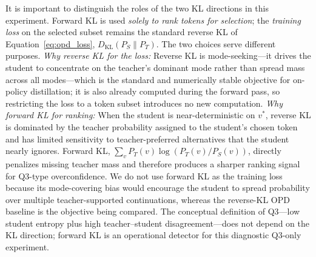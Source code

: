 \documentclass{article}
\newcommand{\KL}{\mathrm{KL}}
\begin{document}
It is important to distinguish the roles of the two KL directions in this experiment.
Forward KL is used \emph{solely to rank tokens for selection}; the \emph{training loss} on the selected subset remains the standard reverse KL of Equation~\ref{eq:opd_loss}, $D_{\KL}(P_S \| P_T)$.
The two choices serve different purposes.
\emph{Why reverse KL for the loss:}
Reverse KL is mode-seeking---it drives the student to concentrate on the teacher's dominant mode rather than spread mass across all modes---which is the standard and numerically stable objective for on-policy distillation; it is also already computed during the forward pass, so restricting the loss to a token subset introduces no new computation.
\emph{Why forward KL for ranking:}
When the student is near-deterministic on $v^*$, reverse KL is dominated by the teacher probability assigned to the student's chosen token and has limited sensitivity to teacher-preferred alternatives that the student nearly ignores.
Forward KL, $\sum_v P_T(v)\log(P_T(v)/P_S(v))$, directly penalizes missing teacher mass and therefore produces a sharper ranking signal for Q3-type overconfidence.
We do not use forward KL as the training loss because its mode-covering bias would encourage the student to spread probability over multiple teacher-supported continuations, whereas the reverse-KL OPD baseline is the objective being compared.
The conceptual definition of Q3---low student entropy plus high teacher--student disagreement---does not depend on the KL direction; forward KL is an operational detector for this diagnostic Q3-only experiment.
\end{document}
